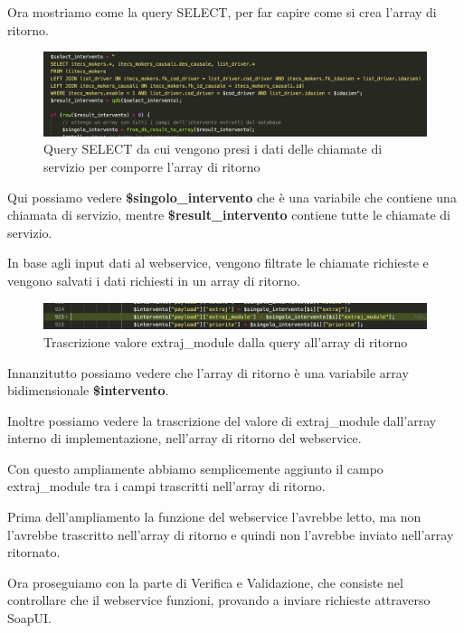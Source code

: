 \newpage

\newspace
\begin{flushleft}
	Ora mostriamo come la query SELECT, per far capire come si crea l'array di ritorno.
\end{flushleft}

\begin{figure}[!h] 
	\centering
	\includegraphics[scale = 0.4]{immagini/webservices/ampliamenti/3ampl__nontoccata_query_select.png}
	\caption{Query SELECT da cui vengono presi i dati delle chiamate di servizio per comporre l'array di ritorno}
\end{figure}
\newspace
Qui possiamo vedere \textbf{\$singolo\_intervento} che è una variabile che contiene una chiamata di servizio, mentre \textbf{\$result\_intervento} contiene tutte le chiamate di servizio.

In base agli input dati al webservice, vengono filtrate le chiamate richieste e vengono salvati i dati richiesti in un array di ritorno.
\newspace
\begin{figure}[!h] 
	\centering
	\includegraphics[scale = 0.5]{immagini/webservices/ampliamenti/3ampl__correzione_functionmokers.png}
	\caption{Trascrizione valore extraj\_module dalla query all'array di ritorno}
\end{figure}
\newspace

\begin{flushleft}
	Innanzitutto possiamo vedere che l'array di ritorno è una variabile array bidimensionale \textbf{\$intervento}.
	\newspace
	
	Inoltre possiamo vedere la trascrizione del valore di extraj\_module dall'array interno di implementazione, nell'array di ritorno del webservice.
	
	Con questo ampliamente abbiamo semplicemente aggiunto il campo extraj\_module tra i campi trascritti nell'array di ritorno.
	
	Prima dell'ampliamento la funzione del webservice l'avrebbe letto, ma non l'avrebbe trascritto nell'array di ritorno e quindi non l'avrebbe inviato nell'array ritornato.
	\newspace
	
	Ora proseguiamo con la parte di Verifica e Validazione, che consiste nel controllare che il webservice funzioni, provando a inviare richieste attraverso SoapUI.
\end{flushleft}
\newspace

